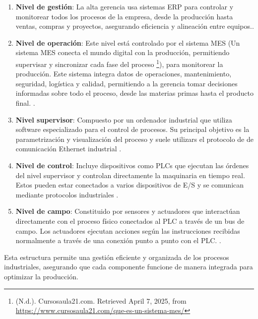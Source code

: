 \begin{enumerate}
    \item \textbf{Nivel de gestión}: La alta gerencia usa sistemas ERP para controlar y monitorear todos los procesos de la empresa, desde la producción hasta ventas, compras y proyectos, asegurando eficiencia y alineación entre equipos.\cite{niveles_automatizacion_2}.
    \item \textbf{Nivel de operación}: Este nivel está controlado por el sistema MES (Un sistema MES conecta el mundo digital con la producción, permitiendo supervisar y sincronizar cada fase del proceso \footnote{  (N.d.). Cursosaula21.com. Retrieved April 7, 2025, from \url{ https://www.cursosaula21.com/que-es-un-sistema-mes/}}), para monitorear la producción. Este sistema integra datos de operaciones, mantenimiento, seguridad, logística y calidad, permitiendo a la gerencia tomar decisiones informadas sobre todo el proceso, desde las materias primas hasta el producto final. \cite{niveles_automatizacion_2}.
    \item \textbf{Nivel supervisor}: Compuesto por un ordenador industrial que utiliza software especializado para el control de procesos. Su principal objetivo es la parametrización y visualización del proceso y suele utilizars el protocolo de de comunicación Ethernet industrial \cite{niveles_automatizacion_1}.
    \item \textbf{Nivel de control}: Incluye dispositivos como PLCs que ejecutan las órdenes del nivel supervisor y controlan directamente la maquinaria en tiempo real. Estos pueden estar conectados a varios dispositivos de E/S y se comunican mediante protocolos industriales \cite{niveles_automatizacion_1}.
    \item \textbf{Nivel de campo}: Constituido por sensores y actuadores que interactúan directamente con el proceso físico conectados al PLC a través de un bus de campo. Los actuadores ejecutan acciones según las instrucciones recibidas normalmente a través de una conexión punto a punto con el PLC. \cite{niveles_automatizacion_1}. 
\end{enumerate}

Esta estructura permite una gestión eficiente y organizada de los procesos industriales, asegurando que cada componente funcione de manera integrada para optimizar la producción. 

